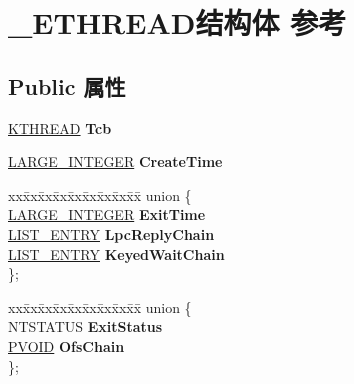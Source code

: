 \hypertarget{struct___e_t_h_r_e_a_d}{}\section{\+\_\+\+E\+T\+H\+R\+E\+A\+D结构体 参考}
\label{struct___e_t_h_r_e_a_d}
\subsection*{Public 属性}
\begin{DoxyCompactItemize}
\item 
\mbox{\label{struct___e_t_h_r_e_a_d_a15bd4ab2d537bb33bdfaf4f0078a1dcd}} 
\hyperlink{struct___k_t_h_r_e_a_d}{K\+T\+H\+R\+E\+AD} {\bfseries Tcb}
\item 
\mbox{\label{struct___e_t_h_r_e_a_d_aaed0e759bcfb254e6cce856103b4f221}} 
\hyperlink{union___l_a_r_g_e___i_n_t_e_g_e_r}{L\+A\+R\+G\+E\+\_\+\+I\+N\+T\+E\+G\+ER} {\bfseries Create\+Time}
\item 
\mbox{\label{struct___e_t_h_r_e_a_d_acf6028b457199850b2f55fb53b0dbca7}} 
\begin{tabbing}
xx\=xx\=xx\=xx\=xx\=xx\=xx\=xx\=xx\=\kill
union \{\\
\>\hyperlink{union___l_a_r_g_e___i_n_t_e_g_e_r}{LARGE\_INTEGER} {\bfseries ExitTime}\\
\>\hyperlink{struct___l_i_s_t___e_n_t_r_y}{LIST\_ENTRY} {\bfseries LpcReplyChain}\\
\>\hyperlink{struct___l_i_s_t___e_n_t_r_y}{LIST\_ENTRY} {\bfseries KeyedWaitChain}\\
\}; \\

\end{tabbing}\item 
\mbox{\label{struct___e_t_h_r_e_a_d_a30ae71d7dae696dcdbdc5bc6484c95d7}} 
\begin{tabbing}
xx\=xx\=xx\=xx\=xx\=xx\=xx\=xx\=xx\=\kill
union \{\\
\>NTSTATUS {\bfseries ExitStatus}\\
\>\hyperlink{interfacevoid}{PVOID} {\bfseries OfsChain}\\
\}; \\


\end{tabbing}
\end{DoxyCompactItemize}
